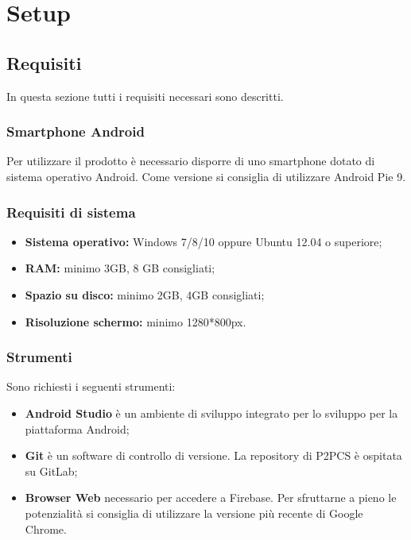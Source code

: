 \section{Setup} 
\subsection{Requisiti}
In questa sezione tutti i requisiti necessari sono descritti.
\subsubsection{Smartphone Android}
Per utilizzare il prodotto è necessario disporre di uno smartphone dotato di sistema operativo Android. Come versione si consiglia di utilizzare Android Pie 9.
\subsubsection{Requisiti di sistema}
\begin{itemize}
	\item \textbf{Sistema operativo:} Windows 7/8/10 oppure Ubuntu 12.04 o superiore;
	\item \textbf{RAM:} minimo 3GB, 8 GB consigliati;
	\item \textbf{Spazio su disco:} minimo 2GB, 4GB consigliati;
	\item \textbf{Risoluzione schermo:} minimo 1280*800px.
\end{itemize}
\subsubsection{Strumenti}
Sono richiesti i seguenti strumenti:
\begin{itemize}
	\item \textbf{Android Studio} è un ambiente di sviluppo integrato per lo sviluppo per la piattaforma Android;
	\item \textbf{Git} è un software di controllo di versione. La repository di P2PCS è ospitata su GitLab;
	\item \textbf{Browser Web} necessario per accedere a Firebase. Per sfruttarne a pieno le potenzialità si consiglia di utilizzare la versione più recente di Google Chrome.
\end{itemize}
